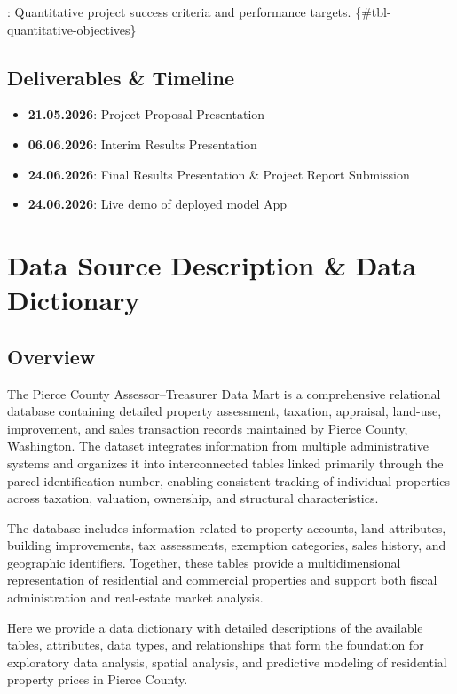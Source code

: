 \documentclass[
  english,
  letterpaper,
  DIV=11,
  numbers=noendperiod]{scrreprt}
\providecommand{\tightlist}{%
  \setlength{\itemsep}{0pt}\setlength{\parskip}{0pt}}
\begin{document}
: Quantitative project success criteria and performance targets.
\{\#tbl-quantitative-objectives\}

\section{Deliverables \& Timeline}\label{deliverables-timeline}

\begin{itemize}
\tightlist
\item
  \textbf{21.05.2026}: Project Proposal Presentation
\item
  \textbf{06.06.2026}: Interim Results Presentation
\item
  \textbf{24.06.2026}: Final Results Presentation \& Project Report
  Submission
\item
  \textbf{24.06.2026}: Live demo of deployed model App
\end{itemize}


\chapter{Data Source Description \& Data
Dictionary}\label{data-source-description-data-dictionary}

\section{Overview}\label{overview}

The Pierce County Assessor--Treasurer Data Mart is a comprehensive
relational database containing detailed property assessment, taxation,
appraisal, land-use, improvement, and sales transaction records
maintained by Pierce County, Washington. The dataset integrates
information from multiple administrative systems and organizes it into
interconnected tables linked primarily through the parcel identification
number, enabling consistent tracking of individual properties across
taxation, valuation, ownership, and structural characteristics.

The database includes information related to property accounts, land
attributes, building improvements, tax assessments, exemption
categories, sales history, and geographic identifiers. Together, these
tables provide a multidimensional representation of residential and
commercial properties and support both fiscal administration and
real-estate market analysis.

Here we provide a data dictionary with detailed descriptions of the
available tables, attributes, data types, and relationships that form
the foundation for exploratory data analysis, spatial analysis, and
predictive modeling of residential property prices in Pierce County.
\end{document}
